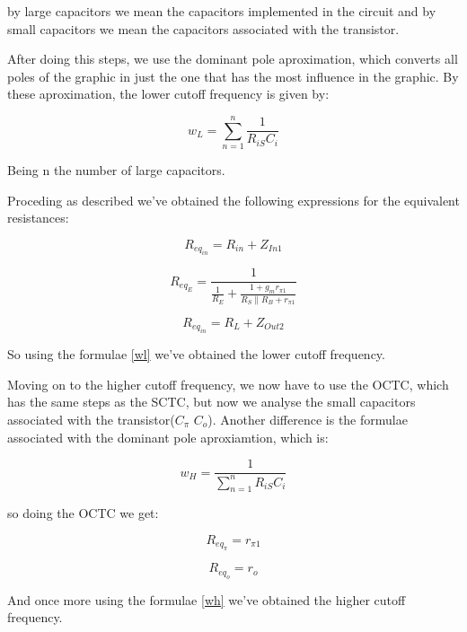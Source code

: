 by large capacitors we mean the capacitors implemented in the circuit and by small capacitors we mean the capacitors associated with the transistor.

After doing this steps, we use the dominant pole aproximation, which converts all poles of the graphic in just the one that has the most influence in the graphic. By these aproximation, the lower cutoff frequency is given by:

\begin{equation}
w_L = \sum_{n = 1}^n \frac{1}{R_{iS}C_i}
\label{wl}
\end{equation} 

Being n the number of large capacitors.

Proceding as described we've obtained the following expressions for the equivalent resistances:

\begin{equation}
R_{eq_{in}} = R_{in} + Z_{In1}
\end{equation} 

\begin{equation}
R_{eq_{E}} = \frac{1}{\frac{1}{R_E}+\frac{1+g_mr_{\pi 1}}{R_S \parallel R_B + r_{\pi 1}}}
\end{equation} 

\begin{equation}
R_{eq_{in}} = R_{L} + Z_{Out2}
\end{equation} 

So using the formulae \ref{wl} we've obtained the lower cutoff frequency.

Moving on to the higher cutoff frequency, we now have to use the OCTC, which has the same steps as the SCTC, but now we analyse the small capacitors associated with the transistor($C_{\pi}$ $C_{o}$). Another difference is the formulae associated with the dominant pole aproxiamtion, which is:

\begin{equation}
w_H = \frac{1}{\sum_{n = 1}^n R_{iS}C_i}
\label{wh}
\end{equation} 

so doing the OCTC we get:

\begin{equation}
R_{eq_{\pi}} = r_{\pi 1}
\end{equation} 

\begin{equation}
R_{eq_{o}} = r_{o}
\end{equation} 

And once more using the formulae \ref{wh} we've obtained the higher cutoff frequency.


